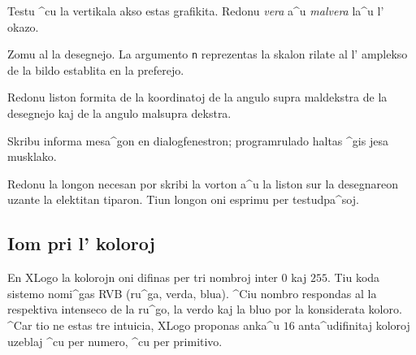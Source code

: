 Testu ^cu la vertikala akso estas grafikita.  Redonu \emph{vera}
a^u \emph{malvera} la^u l' okazo.

Zomu al la desegnejo.  La argumento \texttt{n} reprezentas
la skalon rilate al l' amplekso de la bildo establita en la
preferejo.

Redonu liston formita de la koordinatoj de la angulo supra maldekstra
de la desegnejo kaj de la angulo malsupra dekstra.

Skribu informa mesa^gon en dialogfenestron; programrulado haltas ^gis
jesa musklako.

Redonu la longon necesan por skribi la vorton a^u la liston sur la
desegnareon uzante la elektitan tiparon.  Tiun longon oni esprimu per
testudpa^soj.

\subsection{Iom pri l' koloroj}

En XLogo la kolorojn oni difinas per tri nombroj inter $0$ kaj $255$.
Tiu koda sistemo nomi^gas \og RVB\fg{} (ru^ga, verda, blua).  ^Ciu
nombro respondas al la respektiva intenseco de la ru^go, la verdo kaj
la bluo por la konsiderata koloro.  ^Car tio ne estas tre intuicia,
XLogo proponas anka^u $16$ anta^udifinitaj koloroj uzeblaj ^cu per
numero, ^cu per primitivo. \label{couleurs}

